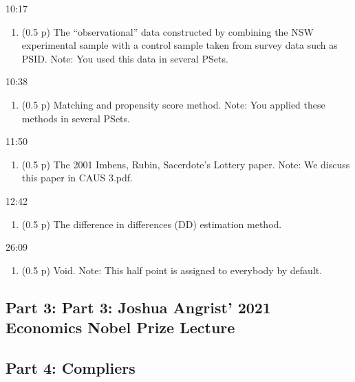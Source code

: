 \documentclass[
]{article}
\providecommand{\tightlist}{%
  \setlength{\itemsep}{0pt}\setlength{\parskip}{0pt}}
\begin{document}
10:17

\begin{enumerate}
\def\labelenumi{\arabic{enumi}.}
\setcounter{enumi}{12}
\tightlist
\item
  (0.5 p) The ``observational'' data constructed by combining the NSW
  experimental sample with a control sample taken from survey data such
  as PSID. Note: You used this data in several PSets.
\end{enumerate}

10:38

\begin{enumerate}
\def\labelenumi{\arabic{enumi}.}
\setcounter{enumi}{13}
\tightlist
\item
  (0.5 p) Matching and propensity score method. Note: You applied these
  methods in several PSets.
\end{enumerate}

11:50

\begin{enumerate}
\def\labelenumi{\arabic{enumi}.}
\setcounter{enumi}{14}
\tightlist
\item
  (0.5 p) The 2001 Imbens, Rubin, Sacerdote's Lottery paper. Note: We
  discuss this paper in CAUS 3.pdf.
\end{enumerate}

12:42

\begin{enumerate}
\def\labelenumi{\arabic{enumi}.}
\setcounter{enumi}{15}
\tightlist
\item
  (0.5 p) The difference in differences (DD) estimation method.
\end{enumerate}

26:09

\begin{enumerate}
\def\labelenumi{\arabic{enumi}.}
\setcounter{enumi}{16}
\tightlist
\item
  (0.5 p) Void. Note: This half point is assigned to everybody by
  default.
\end{enumerate}

\hypertarget{part-3-part-3-joshua-angrist-2021-economics-nobel-prize-lecture}{%
\subsection{Part 3: Part 3: Joshua Angrist' 2021 Economics Nobel Prize
Lecture}\label{part-3-part-3-joshua-angrist-2021-economics-nobel-prize-lecture}}

\hypertarget{part-4-compliers}{%
\subsection{Part 4: Compliers}\label{part-4-compliers}}
\end{document}
